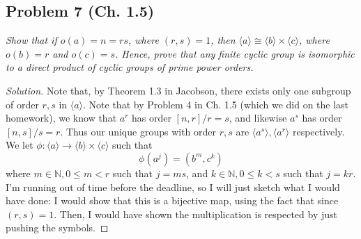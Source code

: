 \documentclass{article}
\newcommand{\N}{{\mathbb N}}
\begin{document}
\subsection*{Problem 7 (Ch. 1.5)}
{\it Show that if $o(a) = n = rs$, where $(r,s) = 1$,
then $\langle a \rangle \cong \langle b \rangle \times \langle c \rangle$,
where $o(b) = r$ and $o(c) = s$.
Hence, prove that any finite cyclic group is isomorphic to a direct product
of cyclic groups of prime power orders.}
\begin{proof}[Solution]\let\qed\relax
	Note that, by Theorem 1.3 in Jacobson,
	there exists only one subgroup of order $r,s$
	in $\langle a \rangle$.
	Note that by Problem 4 in Ch. 1.5
	(which we did on the last homework),
	we know that $a^r$ has order $[n,r]/r = s$,
	and likewise $a^s$ has order $[n,s]/s = r$.
	Thus our unique groups with order $r, s$ are
	$\langle a^s \rangle, \langle a^r \rangle$
	respectively.
	We let $\phi \colon \langle a \rangle \to \langle b \rangle \times \langle c \rangle$ such that
	\[
		\phi(a^j) = (b^m, c^k)
	\]
	where $m\in\N, 0\leq m < r$ such that $j = ms$,
	and $k \in \N, 0\leq k < s$ such that $j = kr$.
	I'm running out of time before the deadline, so I will just sketch what I would have done:
	I would show that this is a bijective map,
	using the fact that since $(r,s) = 1$.
	Then, I would have shown the multiplication is respected by just pushing the symbols.
\end{proof}
\end{document}
